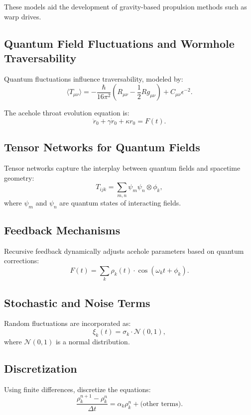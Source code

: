 \documentclass{article}
\theoremstyle{plain}
\begin{document}
\begin{itemize}
\begin{itemize}
These models aid the development of gravity-based propulsion methods such as warp drives.

\subsection{Quantum Field Fluctuations and Wormhole Traversability}
Quantum fluctuations influence traversability, modeled by:
\begin{equation}
\langle T_{\mu\nu} \rangle = - \frac{\hbar}{16\pi^2} \left( R_{\mu\nu} - \frac{1}{2} R g_{\mu\nu} \right) + C_{\mu\nu} \epsilon^{-2}.
\end{equation}

The acehole throat evolution equation is:
\begin{equation}
\ddot{r}_0 + \gamma \dot{r}_0 + \kappa r_0 = F(t).
\end{equation}

\subsection{Tensor Networks for Quantum Fields}
Tensor networks capture the interplay between quantum fields and spacetime geometry:
\begin{equation}
    T_{ijk} = \sum_{m,n} \psi_m \psi_n \otimes \phi_k,
\end{equation}
where $\psi_m$ and $\psi_n$ are quantum states of interacting fields.

\subsection{Feedback Mechanisms}
Recursive feedback dynamically adjusts acehole parameters based on quantum corrections:
\begin{equation}
    F(t) = \sum_{k} \rho_k(t) \cdot \cos(\omega_k t + \phi_k).
\end{equation}

\subsection{Stochastic and Noise Terms}
Random fluctuations are incorporated as:
\begin{equation}
    \xi_k(t) = \sigma_k \cdot \mathcal{N}(0,1),
\end{equation}
where $\mathcal{N}(0,1)$ is a normal distribution.

\subsection{Discretization}
Using finite differences, discretize the equations:
\begin{equation}
    \frac{\rho_k^{n+1} - \rho_k^n}{\Delta t} = \alpha_k \rho_k^n + \text{(other terms)}.
\end{equation}


\end{itemize}
\end{itemize}
\end{document}
